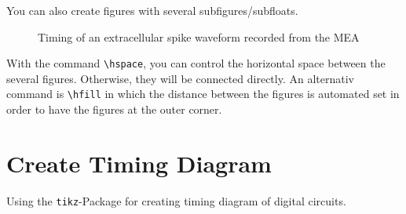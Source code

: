 You can also create figures with several subfigures/subfloats.
\begin{figure}[ht]    \centering
     \hspace{5mm}
    \caption{Timing of an extracellular spike waveform recorded from the MEA}
    \label{fig:TutorialNeuron2}
\end{figure}
With the command \verb+\hspace+, you can control the horizontal space between the several figures. Otherwise, they will be connected directly. An alternativ command is \verb+\hfill+ in which the distance between the figures is automated set in order to have the figures at the outer corner. 
\newpage
\section{Create Timing Diagram}
Using the \verb+tikz+-Package for creating timing diagram of digital circuits.\\


